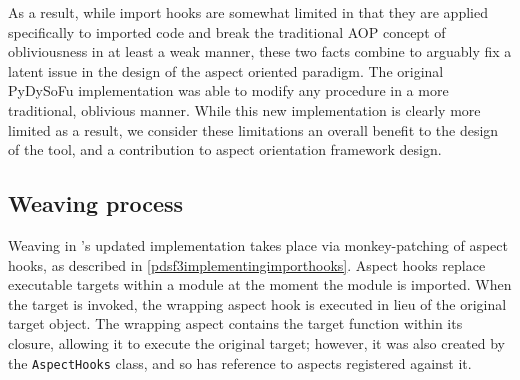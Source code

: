     
As a result, while import hooks are somewhat limited in that they are applied
specifically to imported code and break the traditional AOP concept of
obliviousness in at least a weak manner, these two facts combine to arguably fix
a latent issue in the design of the aspect oriented paradigm. The original
PyDySoFu implementation was able to modify any procedure in a more traditional,
oblivious manner. While this new implementation is clearly more limited as a
result, we consider these limitations an overall benefit to the design of the
tool, and a contribution to aspect orientation framework design.


\subsection{Weaving process}\label{subsec:pdsf3_weaving_process}


Weaving in \pdsf{}'s updated implementation takes place via monkey-patching of
aspect hooks, as described in \cref{pdsf3implementingimporthooks}. Aspect hooks
replace executable targets within a module at the moment the module is imported.
When the target is invoked, the wrapping aspect hook is executed in lieu of the
original target object. The wrapping aspect contains the target function within
its closure, allowing it to execute the original target; however, it was also
created by the \lstinline{AspectHooks} class, and so has reference to aspects
registered against it. 

